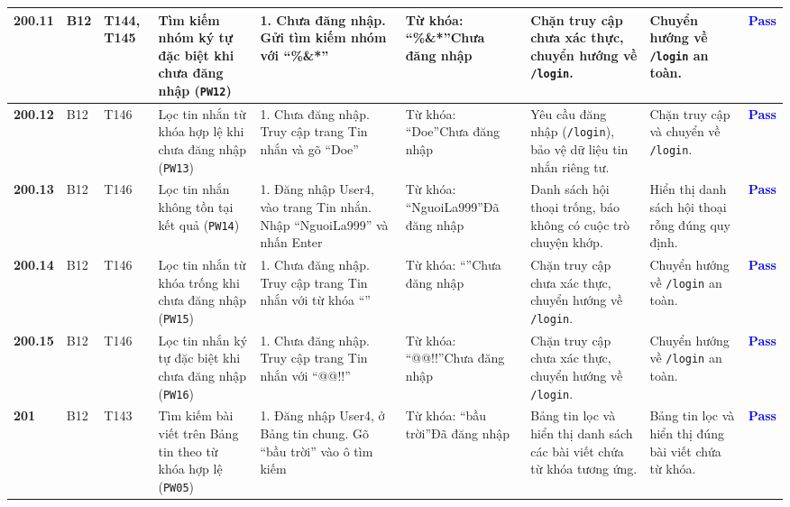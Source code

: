 \documentclass[11pt,a4paper]{article}
\begin{document}
\begin{longtable}{|C{0.9cm}|C{0.7cm}|C{0.9cm}|L{2.0cm}|L{3.0cm}|L{2.2cm}|L{2.6cm}|L{2.5cm}|C{0.85cm}|}
\textbf{200.11} & B12 & T144, T145 & Tìm kiếm nhóm ký tự đặc biệt khi chưa đăng nhập (\texttt{PW12}) & 1. Chưa đăng nhập. Gửi tìm kiếm nhóm với ``\%\&*'' & Từ khóa: ``\%\&*''\newline Chưa đăng nhập & Chặn truy cập chưa xác thực, chuyển hướng về \texttt{/login}. & Chuyển hướng về \texttt{/login} an toàn. & \textcolor{blue}{\textbf{Pass}} \\ \hline
\textbf{200.12} & B12 & T146 & Lọc tin nhắn từ khóa hợp lệ khi chưa đăng nhập (\texttt{PW13}) & 1. Chưa đăng nhập. Truy cập trang Tin nhắn và gõ ``Doe'' & Từ khóa: ``Doe''\newline Chưa đăng nhập & Yêu cầu đăng nhập (\texttt{/login}), bảo vệ dữ liệu tin nhắn riêng tư. & Chặn truy cập và chuyển về \texttt{/login}. & \textcolor{blue}{\textbf{Pass}} \\ \hline
\textbf{200.13} & B12 & T146 & Lọc tin nhắn không tồn tại kết quả (\texttt{PW14}) & 1. Đăng nhập User4, vào trang Tin nhắn. Nhập ``NguoiLa999'' và nhấn Enter & Từ khóa: ``NguoiLa999''\newline Đã đăng nhập & Danh sách hội thoại trống, báo không có cuộc trò chuyện khớp. & Hiển thị danh sách hội thoại rỗng đúng quy định. & \textcolor{blue}{\textbf{Pass}} \\ \hline
\textbf{200.14} & B12 & T146 & Lọc tin nhắn từ khóa trống khi chưa đăng nhập (\texttt{PW15}) & 1. Chưa đăng nhập. Truy cập trang Tin nhắn với từ khóa ``'' & Từ khóa: ``''\newline Chưa đăng nhập & Chặn truy cập chưa xác thực, chuyển hướng về \texttt{/login}. & Chuyển hướng về \texttt{/login} an toàn. & \textcolor{blue}{\textbf{Pass}} \\ \hline
\textbf{200.15} & B12 & T146 & Lọc tin nhắn ký tự đặc biệt khi chưa đăng nhập (\texttt{PW16}) & 1. Chưa đăng nhập. Truy cập trang Tin nhắn với ``@@!!'' & Từ khóa: ``@@!!''\newline Chưa đăng nhập & Chặn truy cập chưa xác thực, chuyển hướng về \texttt{/login}. & Chuyển hướng về \texttt{/login} an toàn. & \textcolor{blue}{\textbf{Pass}} \\ \hline
\textbf{201} & B12 & T143 & Tìm kiếm bài viết trên Bảng tin theo từ khóa hợp lệ (\texttt{PW05}) & 1. Đăng nhập User4, ở Bảng tin chung. Gõ ``bầu trời'' vào ô tìm kiếm & Từ khóa: ``bầu trời''\newline Đã đăng nhập & Bảng tin lọc và hiển thị danh sách các bài viết chứa từ khóa tương ứng. & Bảng tin lọc và hiển thị đúng bài viết chứa từ khóa. & \textcolor{blue}{\textbf{Pass}} \\ \hline
\end{longtable}
\endgroup
\end{document}
